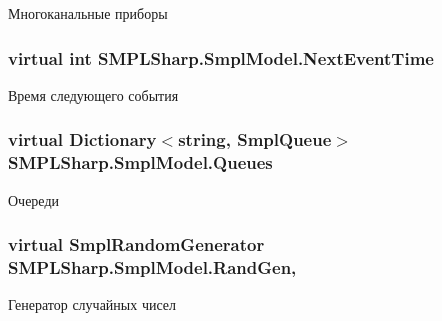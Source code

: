 Многоканальные приборы 

\hypertarget{class_s_m_p_l_sharp_1_1_smpl_model_a83863cdbfb43901325e891a65fd27d40}{
\subsubsection[{Next\-Event\-Time}]{\setlength{\rightskip}{0pt plus 5cm}virtual int S\-M\-P\-L\-Sharp.\-Smpl\-Model.\-Next\-Event\-Time\hspace{0.3cm}{\ttfamily [get]}}}\label{df/d34/class_s_m_p_l_sharp_1_1_smpl_model_a83863cdbfb43901325e891a65fd27d40}


Время следующего события 

\hypertarget{class_s_m_p_l_sharp_1_1_smpl_model_a1bbb9a6e7a49ca06902fa90aa611c719}{
\subsubsection[{Queues}]{\setlength{\rightskip}{0pt plus 5cm}virtual Dictionary$<$string, {\bf Smpl\-Queue}$>$ S\-M\-P\-L\-Sharp.\-Smpl\-Model.\-Queues\hspace{0.3cm}{\ttfamily [get]}}}\label{df/d34/class_s_m_p_l_sharp_1_1_smpl_model_a1bbb9a6e7a49ca06902fa90aa611c719}


Очереди 

\hypertarget{class_s_m_p_l_sharp_1_1_smpl_model_a0f7a947d68471f69ba6afaf03ec15093}{
\subsubsection[{Rand\-Gen}]{\setlength{\rightskip}{0pt plus 5cm}virtual {\bf Smpl\-Random\-Generator} S\-M\-P\-L\-Sharp.\-Smpl\-Model.\-Rand\-Gen\hspace{0.3cm}{\ttfamily [get]}, {\ttfamily [set]}}}\label{df/d34/class_s_m_p_l_sharp_1_1_smpl_model_a0f7a947d68471f69ba6afaf03ec15093}


Генератор случайных чисел 

